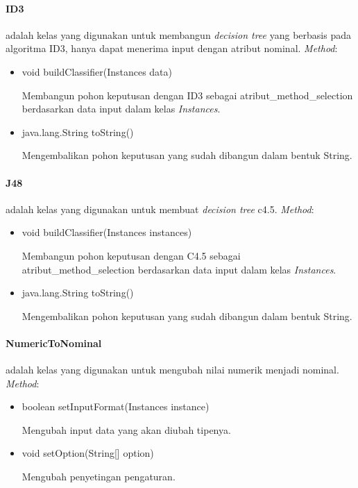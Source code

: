 \paragraph{ID3} adalah kelas yang digunakan untuk membangun \textsl{decision tree} yang berbasis pada algoritma ID3, hanya dapat menerima input dengan atribut nominal.
\textsl{Method}:
\begin{itemize}
	\item void buildClassifier(Instances data)
	
	Membangun pohon keputusan dengan ID3 sebagai atribut\_method\_selection berdasarkan data input dalam kelas \textsl{Instances}.
	
	\item java.lang.String toString()
	
	Mengembalikan pohon keputusan yang sudah dibangun dalam bentuk String.
\end{itemize}

\paragraph{J48} adalah kelas yang digunakan untuk membuat \textsl{decision tree} c4.5.
\textsl{Method}:
\begin{itemize}	
	\item void buildClassifier(Instances instances)
	
	Membangun pohon keputusan dengan C4.5 sebagai atribut\_method\_selection berdasarkan data input dalam kelas \textsl{Instances}.
	
	\item java.lang.String toString()
	
	Mengembalikan pohon keputusan yang sudah dibangun dalam bentuk String.
	\end{itemize}

\paragraph{NumericToNominal} adalah kelas yang digunakan untuk mengubah nilai numerik menjadi nominal.
\textsl{Method}:
\begin{itemize}
	\item boolean setInputFormat(Instances instance)
	
	Mengubah input data yang akan diubah tipenya.
	
	\item void setOption(String[] option)
	
	Mengubah penyetingan pengaturan.
\end{itemize}

